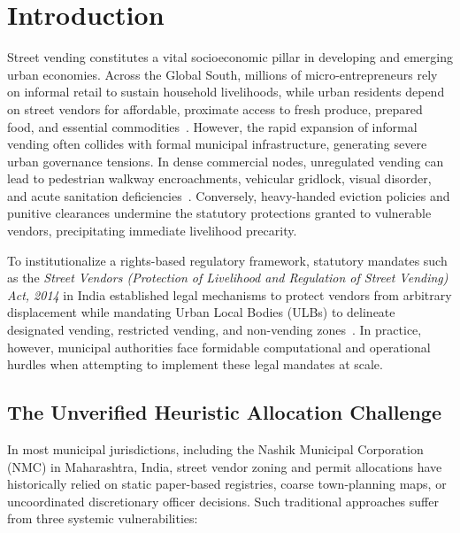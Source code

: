 \section{Introduction}
\label{sec:introduction}

Street vending constitutes a vital socioeconomic pillar in developing and emerging urban economies. Across the Global South, millions of micro-entrepreneurs rely on informal retail to sustain household livelihoods, while urban residents depend on street vendors for affordable, proximate access to fresh produce, prepared food, and essential commodities~\cite{bhowmik2005street, bromley2000street}. However, the rapid expansion of informal vending often collides with formal municipal infrastructure, generating severe urban governance tensions. In dense commercial nodes, unregulated vending can lead to pedestrian walkway encroachments, vehicular gridlock, visual disorder, and acute sanitation deficiencies~\cite{bromley2000street}. Conversely, heavy-handed eviction policies and punitive clearances undermine the statutory protections granted to vulnerable vendors, precipitating immediate livelihood precarity.

To institutionalize a rights-based regulatory framework, statutory mandates such as the \textit{Street Vendors (Protection of Livelihood and Regulation of Street Vending) Act, 2014} in India established legal mechanisms to protect vendors from arbitrary displacement while mandating Urban Local Bodies (ULBs) to delineate designated vending, restricted vending, and non-vending zones~\cite{india2014street}. In practice, however, municipal authorities face formidable computational and operational hurdles when attempting to implement these legal mandates at scale.

\subsection{The Unverified Heuristic Allocation Challenge}
\label{sec:unverified_challenge}

In most municipal jurisdictions, including the Nashik Municipal Corporation (NMC) in Maharashtra, India, street vendor zoning and permit allocations have historically relied on static paper-based registries, coarse town-planning maps, or uncoordinated discretionary officer decisions. Such traditional approaches suffer from three systemic vulnerabilities:

